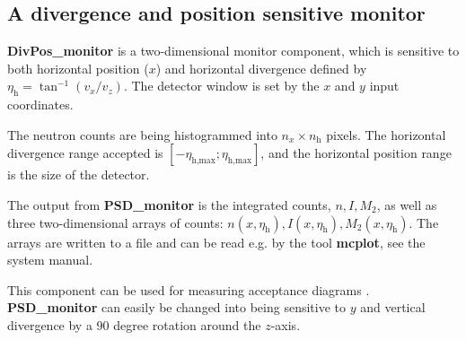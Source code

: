 \subsection*{A divergence and position sensitive monitor}
\label{s:divpos-monitor}

\textbf{DivPos\_monitor} is a two-dimensional monitor component,
which is sensitive to both horizontal position ($x$) and horizontal divergence
defined by $\eta_\textrm{h} = \tan^{-1}(v_x/v_z)$.
The detector window is set
by the $x$ and $y$ input coordinates.

The neutron counts are being histogrammed
into $n_x \times n_\textrm{h}$ pixels. The horizontal divergence range accepted is
$[-\eta_\textrm{h,max}; \eta_\textrm{h,max}]$, and the horizontal position
range is the size of the detector.

The output from \textbf{PSD\_monitor} is the integrated counts, $n, I, M_2$,
as well as
three two-dimensional arrays of counts: $n(x,\eta_\textrm{h}),
I(x,\eta_\textrm{h}), M_2(x,\eta_\textrm{h})$.
The arrays are written to a file and can be read e.g. by the tool
\textbf{mcplot}, see the system manual.

This component can be used for measuring acceptance diagrams \cite{Cussen03}.
\textbf{PSD\_monitor} can easily be changed into being sensitive
to $y$ and vertical divergence by a 90 degree rotation around the $z$-axis.
